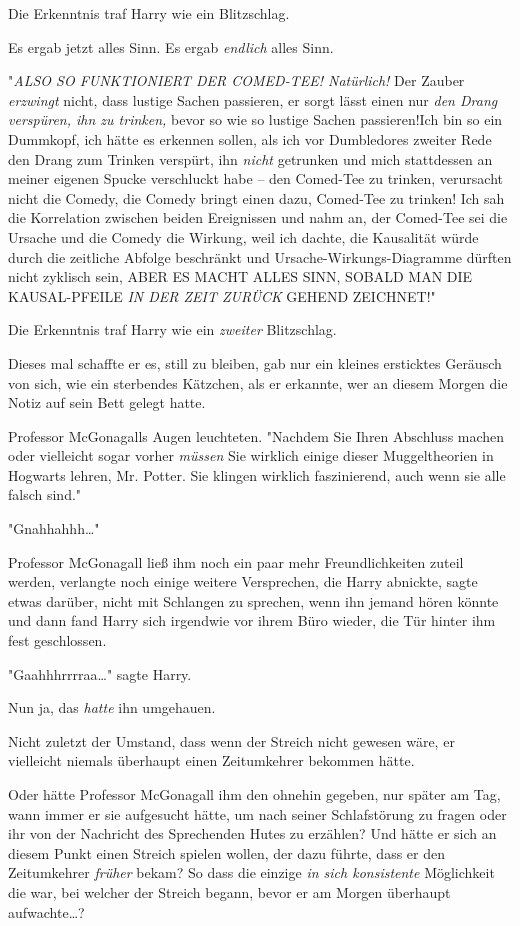 {Die Erkenntnis traf Harry wie ein Blitzschlag.

Es ergab jetzt alles Sinn. Es ergab \emph{endlich} alles Sinn.

"\emph{ALSO SO FUNKTIONIERT DER COMED-TEE! Natürlich!} Der Zauber \emph{erzwingt} nicht, dass lustige Sachen passieren, er sorgt lässt einen nur \emph{den Drang verspüren, ihn zu trinken,} bevor so wie so lustige Sachen passieren!Ich bin so ein Dummkopf, ich hätte es erkennen sollen, als ich vor Dumbledores zweiter Rede den Drang zum Trinken verspürt, ihn \emph{nicht} getrunken und mich stattdessen an meiner eigenen Spucke verschluckt habe -- den Comed-Tee zu trinken, verursacht nicht die Comedy, die Comedy bringt einen dazu, Comed-Tee zu trinken! Ich sah die Korrelation zwischen beiden Ereignissen und nahm an, der Comed-Tee sei die Ursache und die Comedy die Wirkung, weil ich dachte, die Kausalität würde durch die zeitliche Abfolge beschränkt und Ursache-Wirkungs-Diagramme dürften nicht zyklisch sein, ABER ES MACHT ALLES SINN, SOBALD MAN DIE KAUSAL-PFEILE \emph{IN DER ZEIT ZURÜCK} GEHEND ZEICHNET!"

Die Erkenntnis traf Harry wie ein \emph{zweiter} Blitzschlag.

Dieses mal schaffte er es, still zu bleiben, gab nur ein kleines ersticktes Geräusch von sich, wie ein sterbendes Kätzchen, als er erkannte, wer an diesem Morgen die Notiz auf sein Bett gelegt hatte.

Professor McGonagalls Augen leuchteten. "Nachdem Sie Ihren Abschluss machen oder vielleicht sogar vorher \emph{müssen} Sie wirklich einige dieser Muggeltheorien in Hogwarts lehren, Mr. Potter. Sie klingen wirklich faszinierend, auch wenn sie alle falsch sind."

"Gnahhahhh…"

Professor McGonagall ließ ihm noch ein paar mehr Freundlichkeiten zuteil werden, verlangte noch einige weitere Versprechen, die Harry abnickte, sagte etwas darüber, nicht mit Schlangen zu sprechen, wenn ihn jemand hören könnte und dann fand Harry sich irgendwie vor ihrem Büro wieder, die Tür hinter ihm fest geschlossen.

"Gaahhhrrrraa…" sagte Harry.

Nun ja, das \emph{hatte} ihn umgehauen.

Nicht zuletzt der Umstand, dass wenn der Streich nicht gewesen wäre, er vielleicht niemals überhaupt einen Zeitumkehrer bekommen hätte.

Oder hätte Professor McGonagall ihm den ohnehin gegeben, nur später am Tag, wann immer er sie aufgesucht hätte, um nach seiner Schlafstörung zu fragen oder ihr von der Nachricht des Sprechenden Hutes zu erzählen? Und hätte er sich an diesem Punkt einen Streich spielen wollen, der dazu führte, dass er den Zeitumkehrer \emph{früher} bekam? So dass die einzige \emph{in sich konsistente} Möglichkeit die war, bei welcher der Streich begann, bevor er am Morgen überhaupt aufwachte…?

}
